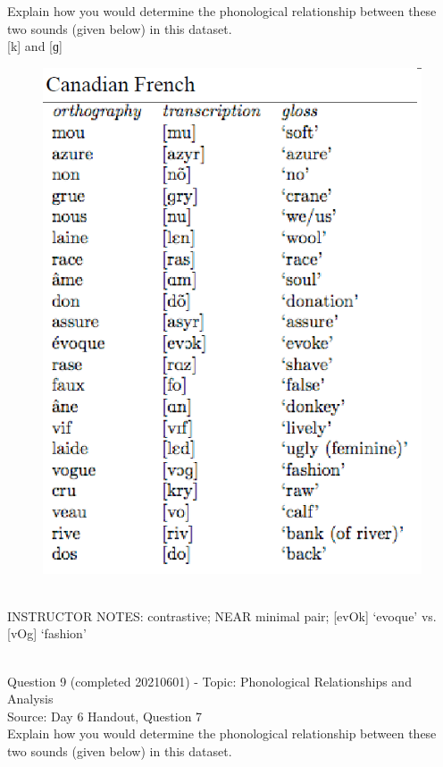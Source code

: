 \documentclass[12pt]{article}
\begin{document}
Explain how you would determine the phonological relationship between these two sounds (given below) in this dataset.\\

{[k]} and {[ɡ]}

\begin{figure}[H]
\includegraphics{../images/canadianfrench.png}
\end{figure}

~\\
INSTRUCTOR NOTES: contrastive; NEAR minimal pair; [evOk] ‘evoque’ vs. [vOg] ‘fashion’


~\\

{\large Question 9} (completed 20210601) - Topic: Phonological Relationships and Analysis\\
Source: Day 6 Handout, Question 7\\

Explain how you would determine the phonological relationship between these two sounds (given below) in this dataset.\\
\end{document}
